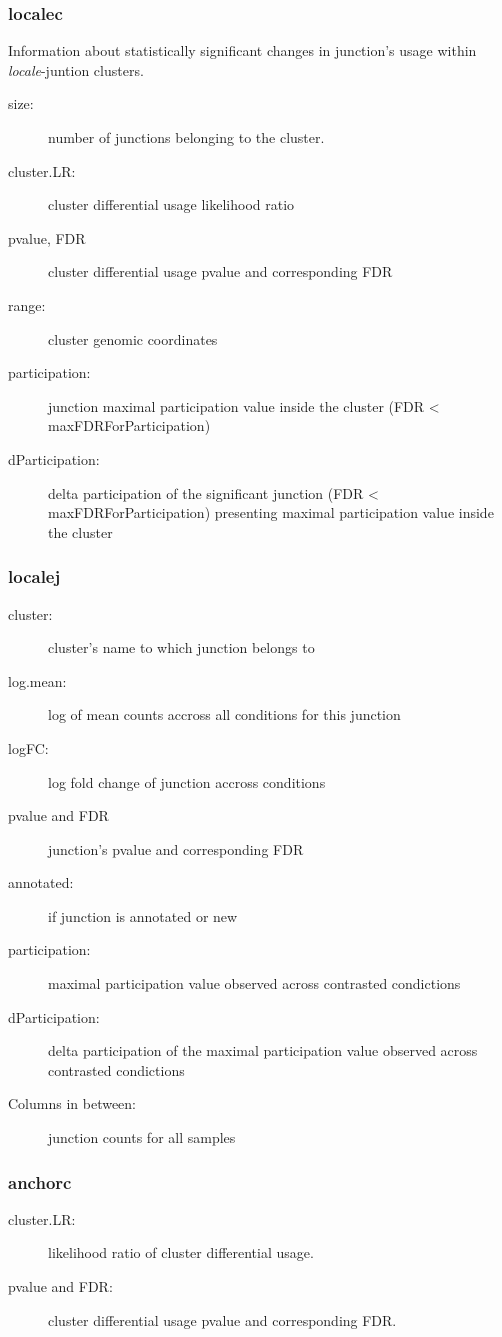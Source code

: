 \documentclass{article}
\begin{document}
\subsubsection*{localec}
Information about statistically significant changes in junction's usage within {\em locale}-juntion clusters.
  \begin{description}
   \item [size:] number of junctions belonging to the cluster.
   \item [cluster.LR:] cluster differential usage likelihood ratio 
   \item [pvalue, FDR] cluster differential usage pvalue and corresponding FDR 
   \item [range:] cluster genomic coordinates
   \item [participation:] junction maximal participation value inside the cluster  (FDR < maxFDRForParticipation)
   \item [dParticipation:] delta participation of the significant junction (FDR < maxFDRForParticipation) presenting maximal participation value inside the cluster 
  \end{description}
  
\subsubsection*{localej}
  \begin{description} 
   \item [cluster:] cluster's name to which junction belongs to
   \item [log.mean:] log of mean counts accross all conditions for this junction
   \item [logFC:] log fold change of junction accross conditions
   \item [pvalue and FDR] junction's pvalue and corresponding FDR
   \item [annotated:] if junction is annotated or new
   \item [participation:] maximal participation value observed across contrasted condictions 
   \item [dParticipation:] delta participation of the maximal participation value observed across contrasted condictions
   \item [Columns in between:] junction counts for all samples
  \end{description}  
  
\subsubsection*{anchorc}
\begin{description}
   \item [cluster.LR:] likelihood ratio of cluster differential usage.
   \item [pvalue and FDR:] cluster differential usage pvalue and corresponding FDR.
   \end{description}   
\end{document}
